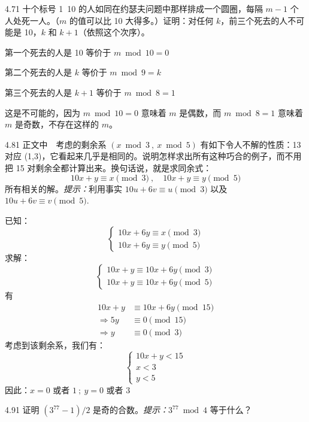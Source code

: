 \begin{problem}{4.7}{1}
  十个标号 1~10 的人如同在约瑟夫问题中那样排成一个圆圈，每隔 \( m-1 \) 个人处死一人。（\( m \) 的值可以比 10 大得多。）证明：对任何 \( k \)，前三个死去的人不可能是 10，\( k \) 和 \( k+1 \)（依照这个次序）。
\end{problem}

第一个死去的人是 10 等价于 \( m \bmod 10 = 0 \)

第二个死去的人是 \( k \) 等价于 \( m \bmod 9 = k \)

第三个死去的人是 \( k+1 \) 等价于 \( m \bmod 8 = 1 \)

这是不可能的，因为 \( m \bmod 10 = 0 \) 意味着 \( m \) 是偶数，而 \( m \bmod 8 = 1 \) 意味着 \( m \) 是奇数，不存在这样的 \( m \)。

\begin{problem}{4.8}{1}
  正文中~\cite{graham1994concrete}~考虑的剩余系 \( (x \bmod{3} \ , \ x \bmod{5}) \) 有如下令人不解的性质：13 对应 (1,3)，它看起来几乎是相同的。说明怎样求出所有这种巧合的例子，而不用把 15 对剩余全都计算出来。换句话说，就是求同余式：
  \[
    10x + y \equiv x \pmod{3} \ , \quad 10x + y \equiv y \pmod{5}
  \]
  所有相关的解。\textit{提示：}利用事实 \( 10u + 6v \equiv u \pmod{3} \) 以及 \( 10u + 6v \equiv v \pmod{5} \).
\end{problem}

已知：
\[
  \begin{cases}
    10x + 6y \equiv x \pmod{3} \\
    10x + 6y \equiv y \pmod{5}
  \end{cases}
\]
求解：
\[
  \begin{cases}
    10x + y \equiv 10x + 6y \pmod{3} \\
    10x + y \equiv 10x + 6y \pmod{5}
  \end{cases}
\]
有
\begin{align*}
  10x + y &\equiv 10x + 6y \pmod{15} \\
  \Rightarrow 5y &\equiv 0 \pmod{15} \\
  \Rightarrow y &\equiv 0 \pmod{3}
\end{align*}
考虑到该剩余系，我们有：
\[
  \begin{cases}
    10x + y < 15 \\
    x < 3 \\
    y < 5
  \end{cases}
\]
因此：\( x = 0 \) 或者 \( 1 \ ; \ y = 0 \) 或者 \( 3 \)

\begin{problem}{4.9}{1}
  证明 \( (3^{77} - 1) / 2 \) 是奇的合数。\textit{提示：}\( 3^{77} \bmod 4 \) 等于什么？
\end{problem}

